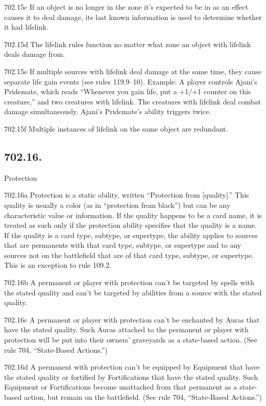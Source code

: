 702.15c If an object is no longer in the zone it’s expected to be in as an effect causes it to deal damage, its last known information is used to determine whether it had lifelink.

702.15d The lifelink rules function no matter what zone an object with lifelink deals damage from.

702.15e If multiple sources with lifelink deal damage at the same time, they cause separate life gain events (see rules 119.9–10).
Example: A player controls Ajani’s Pridemate, which reads “Whenever you gain life, put a +1/+1 counter on this creature,” and two creatures with lifelink. The creatures with lifelink deal combat damage simultaneously. Ajani’s Pridemate’s ability triggers twice.

702.15f Multiple instances of lifelink on the same object are redundant.

\subsection*{702.16.}
Protection

702.16a Protection is a static ability, written “Protection from [quality].” This quality is usually a color (as in “protection from black”) but can be any characteristic value or information. If the quality happens to be a card name, it is treated as such only if the protection ability specifies that the quality is a name. If the quality is a card type, subtype, or supertype, the ability applies to sources that are permanents with that card type, subtype, or supertype and to any sources not on the battlefield that are of that card type, subtype, or supertype. This is an exception to rule 109.2.

702.16b A permanent or player with protection can’t be targeted by spells with the stated quality and can’t be targeted by abilities from a source with the stated quality.

702.16c A permanent or player with protection can’t be enchanted by Auras that have the stated quality. Such Auras attached to the permanent or player with protection will be put into their owners’ graveyards as a state-based action. (See rule 704, “State-Based Actions.”)

702.16d A permanent with protection can’t be equipped by Equipment that have the stated quality or fortified by Fortifications that have the stated quality. Such Equipment or Fortifications become unattached from that permanent as a state-based action, but remain on the battlefield. (See rule 704, “State-Based Actions.”)

